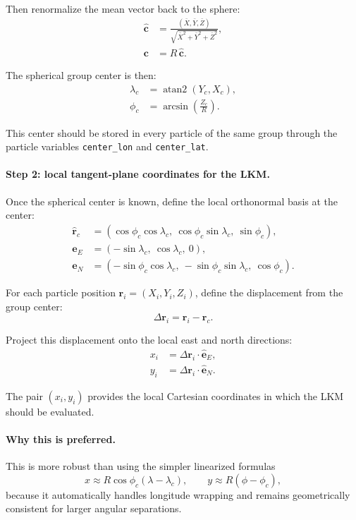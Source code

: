\documentclass[11pt,a4paper]{article}
\begin{document}
	Then renormalize the mean vector back to the sphere:
	\begin{align}
		\hat{\mathbf c} &= \frac{(\bar X,\bar Y,\bar Z)}{\sqrt{\bar X^2+\bar Y^2+\bar Z^2}}, \\
		\mathbf c &= R\,\hat{\mathbf c}.
	\end{align}
	
	The spherical group center is then:
	\begin{align}
		\lambda_c &= \operatorname{atan2}(Y_c, X_c), \\
		\phi_c &= \arcsin\left(\frac{Z_c}{R}\right).
	\end{align}
	
	This center should be stored in every particle of the same group through the particle variables \texttt{center\_lon} and \texttt{center\_lat}.
	
	\paragraph{Step 2: local tangent-plane coordinates for the LKM.}
	Once the spherical center is known, define the local orthonormal basis at the center:
	\begin{align}
		\hat{\mathbf r}_c &= (\cos\phi_c\cos\lambda_c,\ \cos\phi_c\sin\lambda_c,\ \sin\phi_c), \\
		\hat{\mathbf e}_E &= (-\sin\lambda_c,\ \cos\lambda_c,\ 0), \\
		\hat{\mathbf e}_N &= (-\sin\phi_c\cos\lambda_c,\ -\sin\phi_c\sin\lambda_c,\ \cos\phi_c).
	\end{align}
	
	For each particle position $\mathbf r_i = (X_i,Y_i,Z_i)$, define the displacement from the group center:
	\begin{equation}
		\Delta \mathbf r_i = \mathbf r_i - \mathbf r_c.
	\end{equation}
	
	Project this displacement onto the local east and north directions:
	\begin{align}
		x_i &= \Delta \mathbf r_i \cdot \hat{\mathbf e}_E, \\
		y_i &= \Delta \mathbf r_i \cdot \hat{\mathbf e}_N.
	\end{align}
	
	The pair $(x_i, y_i)$ provides the local Cartesian coordinates in which the LKM should be evaluated.
	
	\paragraph{Why this is preferred.}
	This is more robust than using the simpler linearized formulas
	\[
	x \approx R\cos\phi_c(\lambda-\lambda_c), \qquad y \approx R(\phi-\phi_c),
	\]
	because it automatically handles longitude wrapping and remains geometrically consistent for larger angular separations.
	
\end{document}
